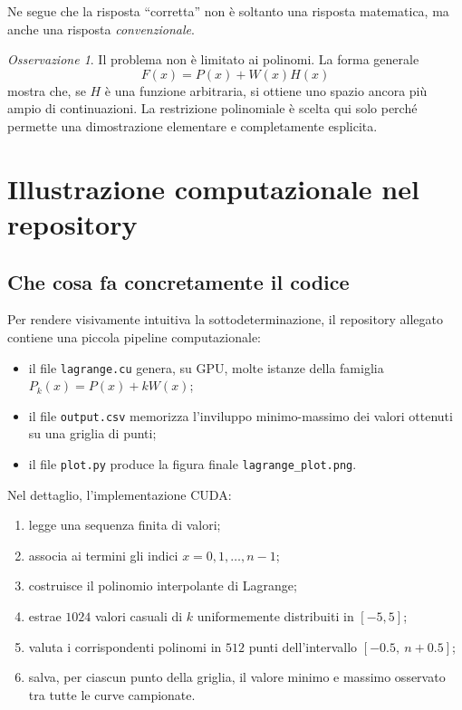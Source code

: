 \documentclass[10pt, a4paper]{article}
\theoremstyle{plain}
\theoremstyle{definition}
\theoremstyle{remark}
\newtheorem{remark}{Osservazione}
\begin{document}
Ne segue che la risposta ``corretta'' non è soltanto una risposta matematica,
ma anche una risposta \emph{convenzionale}.

\begin{remark}
Il problema non è limitato ai polinomi. La forma generale
\[
F(x)=P(x)+W(x)H(x)
\]
mostra che, se $H$ è una funzione arbitraria, si ottiene uno spazio ancora più
ampio di continuazioni. La restrizione polinomiale è scelta qui solo perché
permette una dimostrazione elementare e completamente esplicita.
\end{remark}

\section{Illustrazione computazionale nel repository}
\label{sec:empirical}

\subsection{Che cosa fa concretamente il codice}

Per rendere visivamente intuitiva la sottodeterminazione, il repository allegato
contiene una piccola pipeline computazionale:
\begin{itemize}
    \item il file \texttt{lagrange.cu} genera, su GPU, molte istanze della
          famiglia $P_k(x)=P(x)+kW(x)$;
    \item il file \texttt{output.csv} memorizza l'inviluppo minimo-massimo dei
          valori ottenuti su una griglia di punti;
    \item il file \texttt{plot.py} produce la figura finale
          \texttt{lagrange\_plot.png}.
\end{itemize}

Nel dettaglio, l'implementazione CUDA:
\begin{enumerate}[label=\arabic*.]
    \item legge una sequenza finita di valori;
    \item associa ai termini gli indici $x=0,1,\ldots,n-1$;
    \item costruisce il polinomio interpolante di Lagrange;
    \item estrae $1024$ valori casuali di $k$ uniformemente distribuiti in
          $[-5,5]$;
    \item valuta i corrispondenti polinomi in $512$ punti dell'intervallo
          $[-0.5,\ n+0.5]$;
    \item salva, per ciascun punto della griglia, il valore minimo e massimo
          osservato tra tutte le curve campionate.
\end{enumerate}
\end{document}
